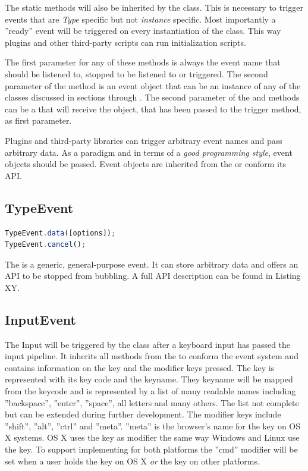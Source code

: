 The static methods will also be inherited by the  class. This is necessary to trigger events that are \textit{Type} specific but not \textit{instance} specific. Most importantly a ''ready'' event will be triggered on every instantiation of the  class. This way plugins and other third-party scripts can run initialization scripts.

The first parameter for any of these methods is always the event name that should be listened to, stopped to be listened to or triggered. The second parameter of the  method is an event object that can be an instance of any of the classes discussed in sections  through . The second parameter of the  and  methods can be a  that will receive the object, that has been passed to the trigger method, as first parameter.

Plugins and third-party libraries can trigger arbitrary event names and pass arbitrary data. As a paradigm and in terms of a \textit{good programming style}, event objects should be passed. Event objects are inherited from the  or conform its API.

\subsection{TypeEvent}
\label{subsec:type_event}

\begin{lstlisting}[language=JavaScript, caption={TypeEvent API}, label=lst:eventapi_methods]
TypeEvent.data([options]);
TypeEvent.cancel();
\end{lstlisting}

The  is a generic, general-purpose event. It can store arbitrary data and offers an API to be stopped from bubbling. A full API description can be found in Listing XY.

\subsection{InputEvent}
\label{subsec:input_event}

The Input  will be triggered by the  class after a keyboard input has passed the input pipeline. It inherits all methods from the  to conform the event system and contains information on the key and the modifier keys pressed. The key is represented with its key code and the keyname. They keyname will be mapped from the keycode and is represented by a list of many readable names including ''backspace'', ''enter'', ''space'', all letters and many others. The list not complete but can be extended during further development. The modifier keys include ''shift'', ''alt'', ''ctrl'' and ''meta''. ''meta'' is the browser's name for the  key on OS X systems. OS X uses the  key as modifier the same way Windows and Linux use the  key. To support implementing for both platforms the ''cmd'' modifier will be set when a user holds the  key on OS X \textit{or} the  key on other platforms.

